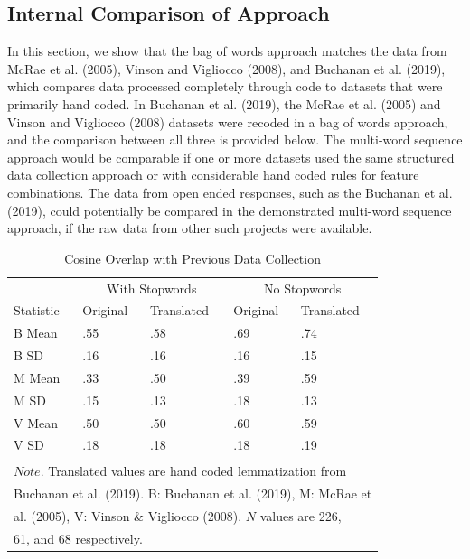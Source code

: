 \documentclass[man]{apa6}
\begin{document}
\hypertarget{internal-comparison-of-approach}{%
\subsection{Internal Comparison of Approach}\label{internal-comparison-of-approach}}

In this section, we show that the bag of words approach matches the data from McRae et al. (2005), Vinson and Vigliocco (2008), and Buchanan et al. (2019), which compares data processed completely through code to datasets that were primarily hand coded. In Buchanan et al. (2019), the McRae et al. (2005) and Vinson and Vigliocco (2008) datasets were recoded in a bag of words approach, and the comparison between all three is provided below. The multi-word sequence approach would be comparable if one or more datasets used the same structured data collection approach or with considerable hand coded rules for feature combinations. The data from open ended responses, such as the Buchanan et al. (2019), could potentially be compared in the demonstrated multi-word sequence approach, if the raw data from other such projects were available.

\begin{table}[t]

\caption{\label{tab:tab7}Cosine Overlap with Previous Data Collection}
\centering
\begin{tabular}{lllll}
\toprule
\multicolumn{1}{c}{ } & \multicolumn{2}{c}{With Stopwords} & \multicolumn{2}{c}{No Stopwords} \\
\cmidrule(l{3pt}r{3pt}){2-3} \cmidrule(l{3pt}r{3pt}){4-5}
Statistic & Original & Translated & Original & Translated\\
\midrule
B Mean & .55 & .58 & .69 & .74\\
B SD & .16 & .16 & .16 & .15\\
M Mean & .33 & .50 & .39 & .59\\
M SD & .15 & .13 & .18 & .13\\
V Mean & .50 & .50 & .60 & .59\\
\addlinespace
V SD & .18 & .18 & .18 & .19\\
\bottomrule
\multicolumn{5}{l}{\textsuperscript{} $Note$. Translated values are hand coded lemmatization from}\\
\multicolumn{5}{l}{Buchanan et al. (2019). B: Buchanan et al. (2019), M: McRae et}\\
\multicolumn{5}{l}{al. (2005), V: Vinson \& Vigliocco (2008). $N$ values are 226,}\\
\multicolumn{5}{l}{61, and 68 respectively.}\\
\end{tabular}
\end{table}
\end{document}
